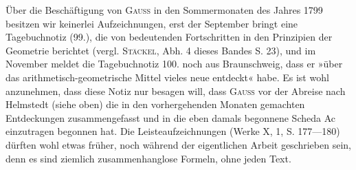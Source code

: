 Über die Beschäftigung von \textsc{Gauss} in den Sommermonaten des Jahres 1799
besitzen wir keinerlei Aufzeichnungen, erst der September bringt eine Tagebuchnotiz
(99.), die von bedeutenden Fortschritten in den Prinzipien der Geometrie
berichtet (vergl. \textsc{Stäckel}, Abh. 4 dieses Bandes S. 23), und im November
meldet die Tagebuchnotiz 100. noch aus Braunschweig, dass er »über das
arithmetisch-geometrische Mittel vieles neue entdeckt« habe. Es ist wohl anzunehmen,
dass diese Notiz nur besagen will, dass \textsc{Gauss} vor der Abreise
nach Helmstedt (siehe oben) die in den vorhergehenden Monaten gemachten
Entdeckungen zusammengefasst und in die eben damals begonnene Scheda Ac
einzutragen begonnen hat. Die Leisteaufzeichnungen (Werke X, 1, S. 177—180)
dürften wohl etwas früher, noch während der eigentlichen Arbeit geschrieben
sein, denn es sind ziemlich zusammenhanglose Formeln, ohne jeden
Text.

